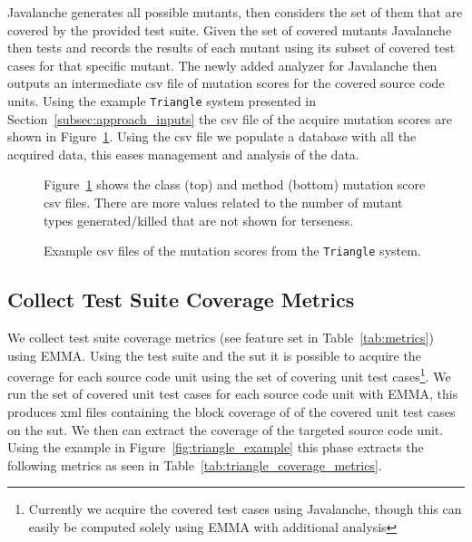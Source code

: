 Javalanche generates all possible mutants, then considers the set of them that are covered by the provided test suite. Given the set of covered mutants Javalanche then tests and records the results of each mutant using its subset of covered test cases for that specific mutant. The newly added analyzer for Javalanche then outputs an intermediate \gls{csv} file of mutation scores for the covered source code units. Using the example \texttt{Triangle} system presented in Section~\ref{subsec:approach_inputs} the \gls{csv} file of the acquire mutation scores are shown in Figure~\ref{fig:triangle_mutation_scores}. Using the \gls{csv} file we populate a database with all the acquired data, this eases management and analysis of the data.

\begin{figure}[h]
  \centering
  
  
  \caption{Example \gls{csv} files of the mutation scores from the \texttt{Triangle} system.}
  \vspace{1mm}
  \footnotesize{Figure~\ref{fig:triangle_mutation_scores} shows the class (top) and method (bottom) mutation score \gls{csv} files. There are more values related to the number of mutant types generated/killed that are not shown for terseness.}
  \vspace{1mm}
  \label{fig:triangle_mutation_scores}
\end{figure}


\subsection{Collect Test Suite Coverage Metrics}
\label{subsec:approach_collect_coverage_metrics}
We collect test suite coverage metrics (see feature set  in Table~\ref{tab:metrics}) using EMMA. Using the test suite and the \gls{sut} it is possible to acquire the coverage for each source code unit using the set of covering unit test cases\footnote{Currently we acquire the covered test cases using Javalanche, though this can easily be computed solely using EMMA with additional analysis}. We run the set of covered unit test cases for each source code unit with EMMA, this produces \gls{xml} files containing the block coverage of of the covered unit test cases on the \gls{sut}. We then can extract the coverage of the targeted source code unit. Using the example in Figure~\ref{fig:triangle_example} this phase extracts the following metrics as seen in Table~\ref{tab:triangle_coverage_metrics}.

